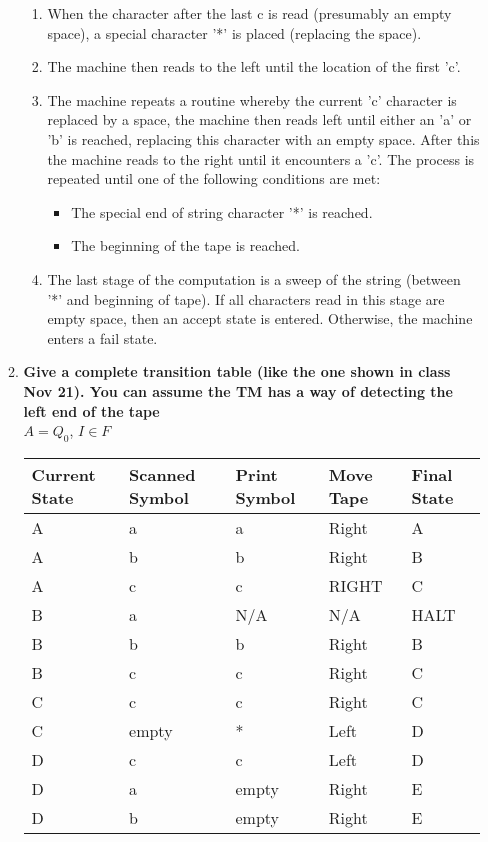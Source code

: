 \documentclass{article}
\begin{document}
\begin{enumerate}
\begin{enumerate}
\begin{enumerate}
					\item When the character after the last c is read (presumably an empty space), a special character '*' is placed (replacing the space).
					\item The machine then reads to the left until the location of the first 'c'.
					\item The machine repeats a routine whereby the current 'c' character is replaced by a space, the machine then reads left until either an 'a' or 'b' is reached, replacing this character with an empty space.  After this the machine reads to the right until it encounters a 'c'.  The process is repeated until one of the following conditions are met:\begin{itemize}
						\item The special end of string character '*' is reached.
						\item The beginning of the tape is reached.
						\end{itemize}
					\item The last stage of the computation is a sweep of the string (between '*' and beginning of tape).  If all characters read in this stage are empty space, then an accept state is entered.  Otherwise, the machine enters a fail state.
				\end{enumerate}
			\item \textbf{Give a complete transition table (like the one shown in class Nov 21). You can assume the TM has a way of detecting the left end of the tape}\\
			$A = Q_0$, $I \in F$\\
      \begin{tabular}{ l | l | l | l | l }
        Current State & Scanned Symbol & Print Symbol & Move Tape & Final State \\ \hline
				A & a & a & Right & A\\
				A & b & b & Right & B\\
				A & c & c & RIGHT & C\\
				B & a & N/A & N/A & HALT\\
				B & b & b & Right & B\\
				B & c & c & Right & C\\
				C & c & c & Right & C\\
				C &empty& * & Left & D\\
				D & c & c & Left & D\\
				D & a &empty& Right & E\\
				D & b &empty& Right & E\\


\end{tabular}
\end{enumerate}
\end{enumerate}
\end{document}
